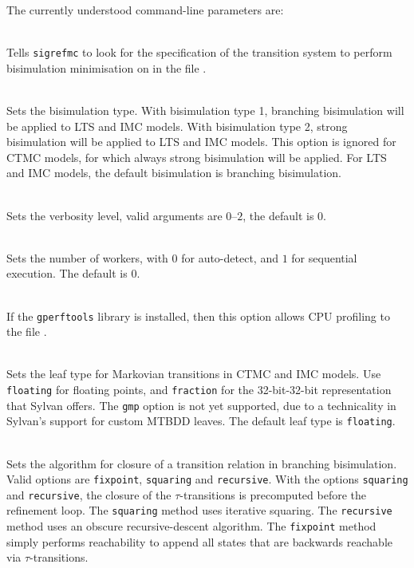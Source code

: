 The currently understood command-line parameters are:
\begin{description}
\itemsep3mm
\item[\option{filename}] \ \\
   Tells \texttt{sigrefmc} to look for the specification of the transition system to perform bisimulation minimisation on in the file .
   
\item[\texttt{-b \option{bisimulation}}] \ \\
   Sets the bisimulation type. With bisimulation type 1, branching bisimulation will be applied to LTS and IMC models. With bisimulation type 2, strong bisimulation will be applied to LTS and IMC models.
   This option is ignored for CTMC models, for which always strong bisimulation will be applied.
   For LTS and IMC models, the default bisimulation is branching bisimulation.

\item[\texttt{-v \option{verbosity}}] \ \\
   Sets the verbosity level, valid arguments are $0$--$2$, the default is 0. 

\item[\texttt{-w \option{workers}}] \ \\
   Sets the number of workers, with $0$ for auto-detect, and $1$ for sequential execution.
   The default is $0$.

\item[\texttt{-p \option{filename}}] \ \\
   If the \texttt{gperftools} library is installed, then this option allows CPU profiling to the file .
   
\item[\texttt{-l \option{leaftype}}] \ \\
   Sets the leaf type for Markovian transitions in CTMC and IMC models.
   Use \texttt{floating} for floating points, and \texttt{fraction} for the 32-bit-32-bit representation that Sylvan offers. The \texttt{gmp} option is not yet supported, due to a technicality in Sylvan's support for custom MTBDD leaves.
   The default leaf type is \texttt{floating}.

\item[\texttt{-c \option{closure}}] \ \\
   Sets the algorithm for closure of a transition relation in branching bisimulation. Valid options are \texttt{fixpoint}, \texttt{squaring} and \texttt{recursive}. With the options \texttt{squaring} and \texttt{recursive}, the closure of the $\tau$-transitions is precomputed before the refinement loop. The \texttt{squaring} method uses iterative squaring. The \texttt{recursive} method uses an obscure recursive-descent algorithm. The \texttt{fixpoint} method simply performs reachability to append all states that are backwards reachable via $\tau$-transitions.


\end{description}
